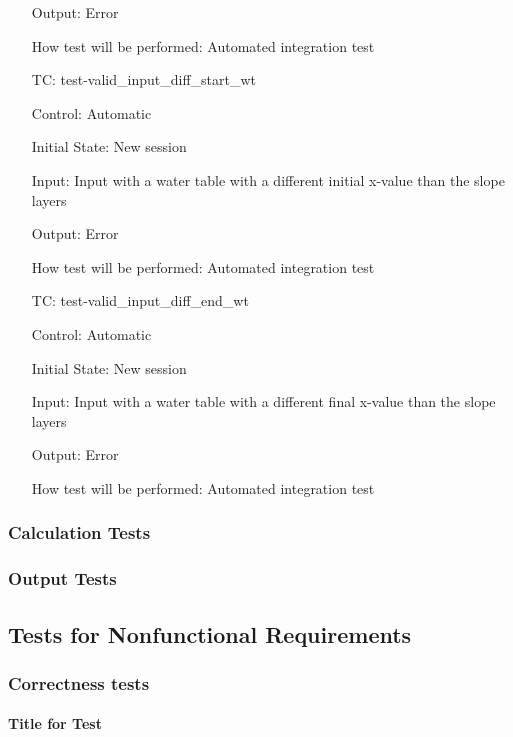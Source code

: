 \documentclass[12pt, titlepage]{article}
\newcounter{testnum} %
\begin{document}
\begin{enumerate}[label=TC\arabic*:,ref={\arabic*}]
	Output: Error
	
	How test will be performed: Automated integration test
	
	\item [TC\refstepcounter{testnum}\thetestnum: 
	\label{TC_InvalidInDiffStartWT}] 
	test-valid\_input\_diff\_start\_wt
	
	Control: Automatic
	
	Initial State: New session
	
	Input: Input with a water table with a different initial x-value than the 
	slope layers
	
	Output: Error
	
	How test will be performed: Automated integration test
	
	\item [TC\refstepcounter{testnum}\thetestnum: 
	\label{TC_InvalidInDiffEndWT}] 
	test-valid\_input\_diff\_end\_wt
	
	Control: Automatic
	
	Initial State: New session
	
	Input: Input with a water table with a different final x-value than the 
	slope layers
	
	Output: Error
	
	How test will be performed: Automated integration test
	
\end{enumerate}

\subsubsection{Calculation Tests}

\subsubsection{Output Tests}

\subsection{Tests for Nonfunctional Requirements}

\subsubsection{Correctness tests}
		
\paragraph{Title for Test}
\end{document}
